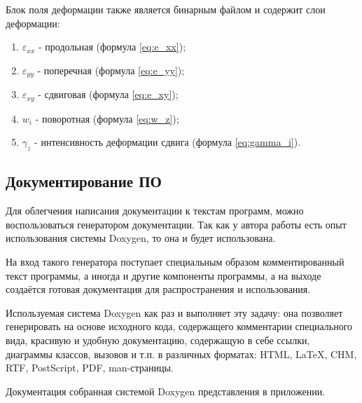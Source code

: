 Блок поля деформации также является бинарным файлом и содержит слои деформации:
\begin{enumerate}
\item $\varepsilon_{xx}$ - продольная (формула \ref{eq:e_xx});
\item $\varepsilon_{yy}$ - поперечная (формула \ref{eq:e_yy});
\item $\varepsilon_{xy}$ - сдвиговая (формула \ref{eq:e_xy});
\item $w_{i}$ - поворотная (формула \ref{eq:w_z});
\item $\gamma_z$ - интенсивность деформации сдвига (формула \ref{eq:gamma_i}).
\end{enumerate}

\subsection{Документирование ПО}
Для облегчения написания документации к текстам программ, можно воспользоваться генератором документации. Так как у автора работы есть опыт использования системы Doxygen, то она и будет использована.

На вход такого генератора поступает специальным образом комментированный текст программы, а иногда и другие компоненты программы, а на выходе создаётся готовая документация для распространения и использования.

Используемая система Doxygen как раз и выполняет эту задачу: она позволяет генерировать на основе исходного кода, содержащего комментарии специального вида, красивую и удобную документацию, содержащую в себе ссылки, диаграммы классов, вызовов и т.п. в различных форматах: HTML, LaTeX, CHM, RTF, PostScript, PDF, man-страницы.

Документация собранная системой Doxygen представления в приложении.
